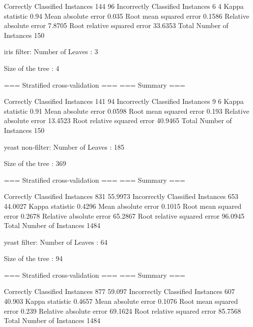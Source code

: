 Correctly Classified Instances         144               96      %
Incorrectly Classified Instances         6                4      %
Kappa statistic                          0.94  
Mean absolute error                      0.035 
Root mean squared error                  0.1586
Relative absolute error                  7.8705 %
Root relative squared error             33.6353 %
Total Number of Instances              150     


iris filter:
Number of Leaves  : 	3

Size of the tree : 	4

=== Stratified cross-validation ===
=== Summary ===

Correctly Classified Instances         141               94      %
Incorrectly Classified Instances         9                6      %
Kappa statistic                          0.91  
Mean absolute error                      0.0598
Root mean squared error                  0.193 
Relative absolute error                 13.4523 %
Root relative squared error             40.9465 %
Total Number of Instances              150     



yeast non-filter:
Number of Leaves  : 	185

Size of the tree : 	369


=== Stratified cross-validation ===
=== Summary ===

Correctly Classified Instances         831               55.9973 %
Incorrectly Classified Instances       653               44.0027 %
Kappa statistic                          0.4296
Mean absolute error                      0.1015
Root mean squared error                  0.2678
Relative absolute error                 65.2867 %
Root relative squared error             96.0945 %
Total Number of Instances             1484     



yeast filter:
Number of Leaves  : 	64

Size of the tree : 	94

=== Stratified cross-validation ===
=== Summary ===

Correctly Classified Instances         877               59.097  %
Incorrectly Classified Instances       607               40.903  %
Kappa statistic                          0.4657
Mean absolute error                      0.1076
Root mean squared error                  0.239 
Relative absolute error                 69.1624 %
Root relative squared error             85.7568 %
Total Number of Instances             1484     



